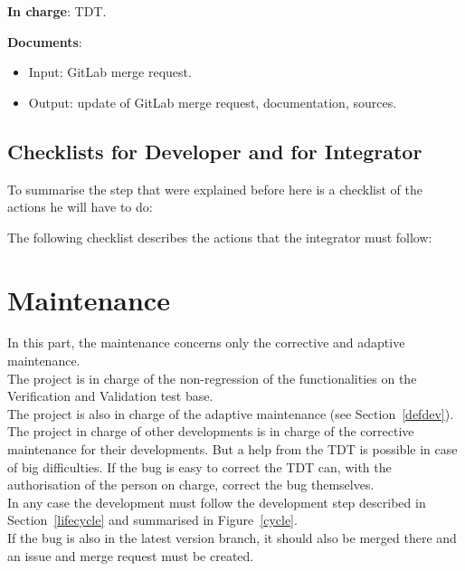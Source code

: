 \textbf{In charge}: TDT\@.

\textbf{Documents}:
\begin{itemize}
\item Input: GitLab merge request.
\item Output: update of GitLab merge request, documentation, sources.
\end{itemize}

\subsection{Checklists for Developer and for Integrator}

To summarise the step that were explained before here is a checklist of the
actions he will have to do:


The following checklist describes the actions that the integrator must follow:


\section{Maintenance}

In this part, the maintenance concerns only the corrective and adaptive
maintenance.\\

The \telemacsystem{} project is in charge of the non-regression of the
\telemacsystem{} functionalities on the Verification and Validation test
base.\\

The \telemacsystem{} project is also in charge of the adaptive maintenance (see
Section~\ref{defdev}).\\

The project in charge of other developments is in charge of the corrective
maintenance for their developments. But a help from the TDT is possible in
case of big difficulties. If the bug is easy to correct the TDT can, with the
authorisation of the person on charge, correct the bug themselves.\\

In any case the development must follow the development step described in
Section~\ref{lifecycle} and summarised in Figure~\ref{cycle}.\\

If the bug is also in the latest version branch, it should also be merged there
and an issue and merge request must be created.\\

